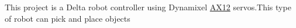 This project is a Delta robot controller using Dynamixel \hyperlink{a00001}{A\+X12} servos.\+This type of robot can pick and place objects 